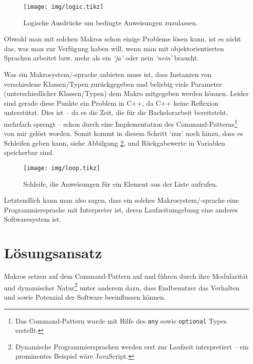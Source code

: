     \begin{figure}[H]
      \centering
      \texttt{[image: img/logic.tikz]}
      \caption{Logische Ausdrücke um bedingte Anweisungen zuzulassen.}
      \label{fig:logic}
    \end{figure}

    Obwohl man mit solchen Makros schon einige Probleme lösen kann, ist es nicht das, was man zur Verfügung haben will, wenn man mit objektorientierten Sprachen arbeitet bzw. mehr als ein \textit{`ja'} oder nein \textit{`nein'} braucht.

    Was ein Makrosystem/-sprache anbieten muss ist, dass Instanzen von verschiedene Klassen/Typen zurückgegeben und beliebig viele Parameter (unterschiedlicher Klassen/Typen) dem Makro mitgegeben werden können. Leider sind gerade diese Punkte ein Problem in C++, da C++ keine Reflexion\autocites{vinoski2005time}{ferber1989computational} unterstützt. Dies ist -- da es die Zeit, die für die Bachelorarbeit bereitsteht, mehrfach sprengt -- schon durch eine Implementation des Command-Patterns\footnote{%
      Das Command-Pattern wurde mit Hilfe des \texttt{any}
      sowie \texttt{optional}
      Types erstellt.
    }\spewnotes{}
    von mir gelöst worden. Somit kommt in diesem Schritt `nur' noch hinzu, dass es Schleifen geben kann,  siehe Abbilgung \ref{fig:loop}, und Rückgabewerte in Variablen speicherbar sind.

    \begin{figure}[H]
      \centering
      \texttt{[image: img/loop.tikz]}
      \caption{Schleife, die Anweisungen für ein Element aus der Liste aufrufen.}
      \label{fig:loop}
    \end{figure}

    Letztendlich kann man also sagen, dass ein solches Makrosystem/-sprache eine Programmiersprache mit Interpreter\autocite[S.274]{Gamma:1995:DPE:186897} ist, deren Laufzeitumgebung eine anderes Softwaresystem ist.

\section{Lösungsansatz}
\label{sec:loesungsansatz}
  Makros setzen auf dem Command-Pattern\autocite[S.263]{Gamma:1995:DPE:186897} auf und führen durch ihre Modularität und dynamischer Natur\footnote{%
    Dynamische Programmiersprachen werden erst zur Laufzeit interpretiert -- ein prominentes Beispiel wäre JavaScript.
  } unter anderem dazu, dass Endbenutzer das Verhalten und sowie Potenzial der Software beeinflussen können.

